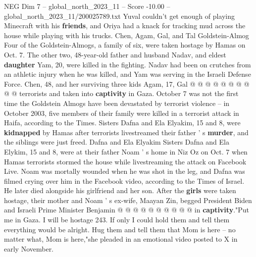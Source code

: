 \begin{textsample}{NEG Dim 7 – global\_north\_2023\_11 – Score -10.00 – global\_north\_2023\_11/200025789.txt}
Yuval couldn't get enough of playing Minecraft with his \textbf{friends}, and Oriya had a knack for tracking mud across the house while playing with his trucks.
Chen, Agam, Gal, and Tal Goldstein-Almog Four of the Goldstein-Almogs, a family of six, were taken hostage by Hamas on Oct. 7.
The other two, 48-year-old father and husband Nadav, and eldest \textbf{daughter} Yam, 20, were killed in the fighting.
Nadav had been on crutches from an athletic injury when he was killed, and Yam was serving in the Israeli Defense Force.
Chen, 48, and her surviving three kids Agam, 17, Gal @ @ @ @ @ @ @ @ @ @ terrorists and taken into \textbf{captivity} in Gaza.
October 7 was not the first time the Goldstein Almogs have been devastated by terrorist violence -- in October 2003, five members of their family were killed in a terrorist attack in Haifa, according to the Times.
Sisters Dafna and Ela Elyakim, 15 and 8, were \textbf{kidnapped} by Hamas after terrorists livestreamed their father ' s \textbf{murder}, and the siblings were just freed.
Dafna and Ela Elyakim Sisters Dafna and Ela Elykim, 15 and 8, were at their father Noam ' s home in Niz Oz on Oct. 7 when Hamas terrorists stormed the house while livestreaming the attack on Facebook Live.
Noam was mortally wounded when he was shot in the leg, and Dafna was filmed crying over him in the Facebook video, according to the Times of Israel.
He later died alongside his girlfriend and her son.
After the \textbf{girls} were taken hostage, their mother and Noam ' s ex-wife, Maayan Zin, begged President Biden and Israeli Prime Minister Benjamin @ @ @ @ @ @ @ @ @ @ in \textbf{captivity}."Put me in Gaza.
I will be hostage 243.
If only I could hold them and tell them everything would be alright.
Hug them and tell them that Mom is here -- no matter what, Mom is here,"she pleaded in an emotional video posted to X in early November.

\end{textsample}
